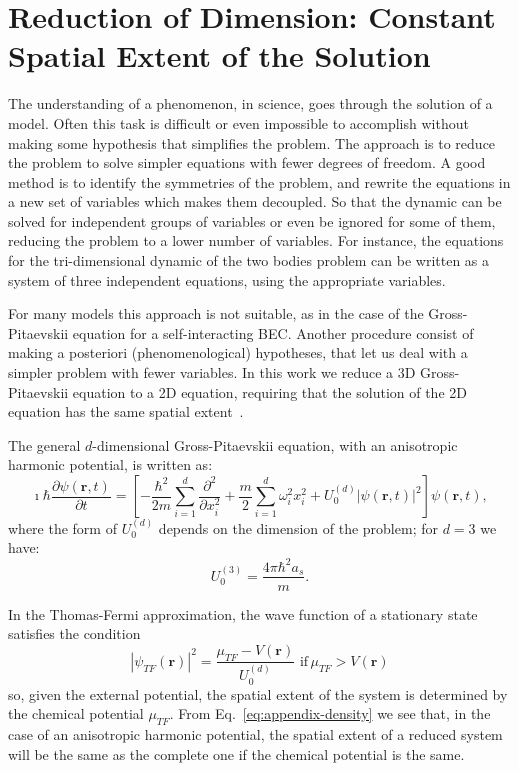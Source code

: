 \chapter{Reduction of Dimension: Constant Spatial Extent of the Solution} \label{App:A}
The understanding of a phenomenon, in science, goes through the solution of a model. Often this task is difficult or even impossible to accomplish without making some hypothesis that simplifies the problem. The approach is to reduce the problem to solve simpler equations with fewer degrees of freedom. A good method is to identify the symmetries of the problem, and rewrite the equations in a new set of variables which makes them decoupled. So that the dynamic can be solved for independent groups of variables or even be ignored for some of them, reducing the problem to a lower number of variables. For instance, the equations for the tri-dimensional dynamic of the two bodies problem can be written as a system of three independent equations, using the appropriate variables.

For many models this approach is not suitable, as in the case of the Gross-Pitaevskii equation for a self-interacting BEC. Another procedure consist of making a posteriori (phenomenological) hypotheses, that let us deal with a simpler problem with fewer variables. In this work we reduce a 3D Gross-Pitaevskii equation to a 2D equation, requiring that the solution of the 2D equation has the same spatial extent~\citep{PietroMassignan}.

The general $d$-dimensional Gross-Pitaevskii equation, with an anisotropic harmonic potential, is written as:
\begin{equation}
\imath \hbar \frac{\partial \psi(\textbf{r}, t)}{\partial t} = \left[ - \frac{\hbar^2}{2m} \sum_{i=1}^d \frac{\partial^2}{\partial x_i^2} + \frac{m}{2} \sum_{i=1}^d \omega_i^2 x_i^2 + U_0^{(d)} |\psi(\textbf{r}, t)|^2 \right] \psi(\textbf{r}, t),
\end{equation}
where the form of $U_0^{(d)}$ depends on the dimension of the problem; for $d=3$ we have:
\begin{equation}
U_0^{(3)} = \frac{4\pi \hbar^2 a_s}{m}.
\end{equation}

In the Thomas-Fermi approximation, the wave function of a stationary state satisfies the condition
\begin{equation} \label{eq:appendix-density}
|\psi_{TF}(\textbf{r})|^2 = \frac{\mu_{TF} - V(\textbf{r})}{U_0^{(d)}} \,\, \mathrm{if} \, \mu_{TF}  > V(\textbf{r})
\end{equation}
so, given the external potential, the spatial extent of the system is determined by the chemical potential $\mu_{TF}$. From Eq.~\eqref{eq:appendix-density} we see that, in the case of an anisotropic harmonic potential, the spatial extent of a reduced system will be the same as the complete one if the chemical potential is the same.

